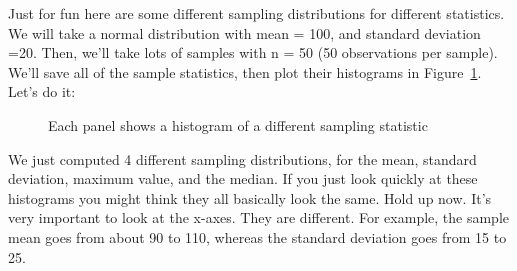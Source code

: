 \documentclass[
  letterpaper,
  DIV=11,
  numbers=noendperiod]{scrreprt}
\begin{document}
Just for fun here are some different sampling distributions for
different statistics. We will take a normal distribution with mean =
100, and standard deviation =20. Then, we'll take lots of samples with n
= 50 (50 observations per sample). We'll save all of the sample
statistics, then plot their histograms in Figure~\ref{fig-4samplestats}.
Let's do it:

\begin{figure}


\caption{\label{fig-4samplestats}Each panel shows a histogram of a
different sampling statistic}

\end{figure}%

We just computed 4 different sampling distributions, for the mean,
standard deviation, maximum value, and the median. If you just look
quickly at these histograms you might think they all basically look the
same. Hold up now. It's very important to look at the x-axes. They are
different. For example, the sample mean goes from about 90 to 110,
whereas the standard deviation goes from 15 to 25.
\end{document}
